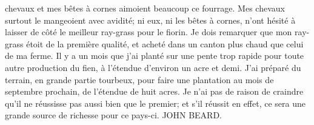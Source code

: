 chevaux et mes bêtes à cornes aimoient beaucoup ce fourrage. Mes chevaux surtout le mangeoient avec avidité; ni eux, ni les bêtes à cornes, n'ont hésité à laisser de côté le meilleur ray-grass pour le fiorin. Je dois remarquer que mon ray-grass étoit de la première qualité, et acheté dans un canton plus chaud que celui de ma ferme. Il y a un mois que j'ai planté sur une pente trop\setcounter{page}{296} rapide pour toute autre production du fien, à l'étendue d'environ un acre et demi. J'ai préparé du terrain, en grande partie tourbeux, pour faire une plantation au mois de septembre prochain, de l'étendue de huit acres. Je n'ai pas de raison de craindre qu'il ne réussisse pas aussi bien que le premier; et s'il réussit en effet, ce sera une grande source de richesse pour ce pays-ci.
JOHN BEARD.
